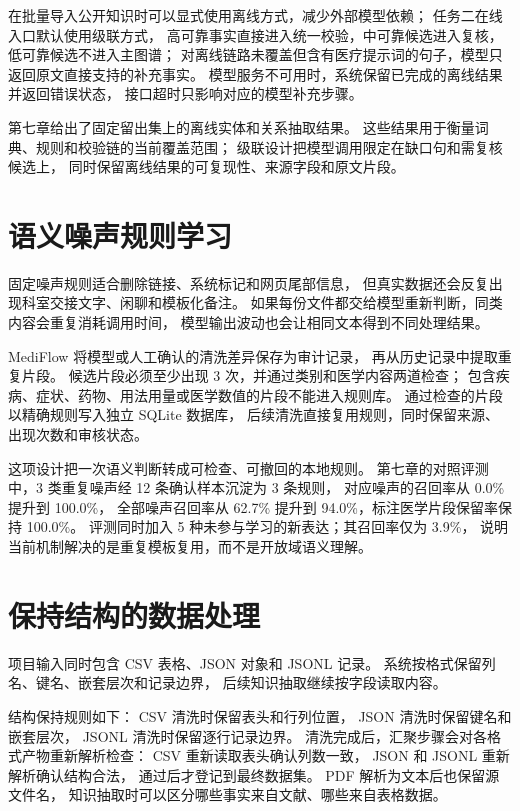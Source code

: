 在批量导入公开知识时可以显式使用离线方式，减少外部模型依赖；
任务二在线入口默认使用级联方式，
高可靠事实直接进入统一校验，中可靠候选进入复核，低可靠候选不进入主图谱；
对离线链路未覆盖但含有医疗提示词的句子，模型只返回原文直接支持的补充事实。
模型服务不可用时，系统保留已完成的离线结果并返回错误状态，
接口超时只影响对应的模型补充步骤。

第七章给出了固定留出集上的离线实体和关系抽取结果。
这些结果用于衡量词典、规则和校验链的当前覆盖范围；
级联设计把模型调用限定在缺口句和需复核候选上，
同时保留离线结果的可复现性、来源字段和原文片段。

\section{语义噪声规则学习}

固定噪声规则适合删除链接、系统标记和网页尾部信息，
但真实数据还会反复出现科室交接文字、闲聊和模板化备注。
如果每份文件都交给模型重新判断，同类内容会重复消耗调用时间，
模型输出波动也会让相同文本得到不同处理结果。

MediFlow 将模型或人工确认的清洗差异保存为审计记录，
再从历史记录中提取重复片段。
候选片段必须至少出现 3 次，并通过类别和医学内容两道检查；
包含疾病、症状、药物、用法用量或医学数值的片段不能进入规则库。
通过检查的片段以精确规则写入独立 SQLite 数据库，
后续清洗直接复用规则，同时保留来源、出现次数和审核状态。

这项设计把一次语义判断转成可检查、可撤回的本地规则。
第七章的对照评测中，3 类重复噪声经 12 条确认样本沉淀为 3 条规则，
对应噪声的召回率从 0.0\% 提升到 100.0\%，
全部噪声召回率从 62.7\% 提升到 94.0\%，标注医学片段保留率保持 100.0\%。
评测同时加入 5 种未参与学习的新表达；其召回率仅为 3.9\%，
说明当前机制解决的是重复模板复用，而不是开放域语义理解。

\section{保持结构的数据处理}

项目输入同时包含 CSV 表格、JSON 对象和 JSONL 记录。
系统按格式保留列名、键名、嵌套层次和记录边界，
后续知识抽取继续按字段读取内容。

结构保持规则如下：
CSV 清洗时保留表头和行列位置，
JSON 清洗时保留键名和嵌套层次，
JSONL 清洗时保留逐行记录边界。
清洗完成后，汇聚步骤会对各格式产物重新解析检查：
CSV 重新读取表头确认列数一致，
JSON 和 JSONL 重新解析确认结构合法，
通过后才登记到最终数据集。
PDF 解析为文本后也保留源文件名，
知识抽取时可以区分哪些事实来自文献、哪些来自表格数据。

